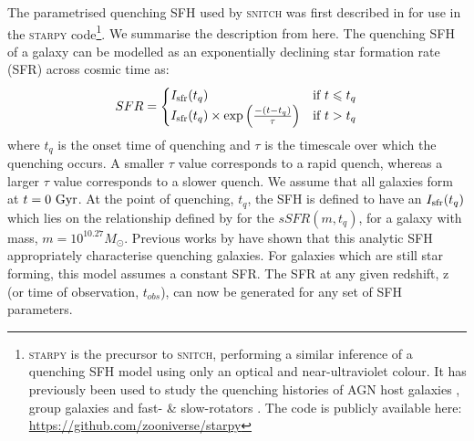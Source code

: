 \documentclass[useAMS,usenatbib]{mn2e}
\def\referee		{\color{refer}}
\begin{document}
The parametrised quenching SFH used by \textsc{snitch} was first described in \cite{smethurst15} for use in the \textsc{starpy} code\footnote{\textsc{starpy} is the precursor to \textsc{snitch}, performing a similar inference of a quenching SFH model using only an optical and near-ultraviolet colour. It has previously been used to study the quenching histories of AGN host galaxies \citep{smethurst16}, group galaxies \citep{smethurst17} and fast- \& slow-rotators \citep{smethurst18}. The code is publicly available here: \url{https://github.com/zooniverse/starpy}}. {\referee We summarise the description from \cite{smethurst15} here. The quenching SFH of a galaxy can be modelled as an exponentially declining star formation rate (SFR) across cosmic time as:
\begin{equation}\label{sfh}
SFR =
\begin{cases}
I_{\rm{sfr}}(t_q) & \text{if } t \leq t_q \\
I_{\rm{sfr}}(t_q) \times \exp{\left( \frac{-(t-t_{q})}{\tau}\right)} & \text{if } t > t_q 
\end{cases}
\end{equation}
where $t_{q}$ is the onset time of quenching and $\tau$ is the timescale over which the quenching occurs.  A smaller $\tau$ value corresponds to a rapid quench, whereas a larger $\tau$ value corresponds to a slower quench. We assume that all galaxies form at $t=0~\rm{Gyr}$. At the point of quenching, $t_{q}$, the SFH is defined to have an $I_{\rm{sfr}}(t_q)$ which lies on the relationship defined by \citet[][Equation 1]{peng10} for the $sSFR(m,t_q)$, for a galaxy with mass, $m = 10^{10.27} M_{\odot}$. Previous works by \citep{weiner06, martin07, noeske07,schawinski14, smethurst15} have shown that this analytic SFH appropriately characterise quenching galaxies. For galaxies which are still star forming, this model assumes a constant SFR. The SFR at any given redshift, z (or time of observation, $t_{obs}$), can now be generated for any set of SFH parameters.}



\end{document}
